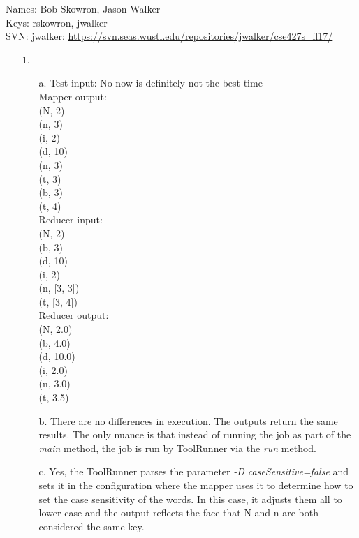 \documentclass{article}
\begin{document}
\begin{flushleft}
Names: Bob Skowron, Jason Walker\\
Keys: rskowron, jwalker\\
SVN: jwalker: \url{https://svn.seas.wustl.edu/repositories/jwalker/cse427s_fl17/}\\
\end{flushleft}

\begin{itemize}
\item[1.] 
	\begin{itemize}
	\item[a.] Test input: No now is definitely not the best time \\
		Mapper output:\\
			(N, 2)\\
			(n, 3)\\
			(i, 2)\\
			(d, 10)\\
			(n, 3)\\
			(t, 3)\\
			(b, 3)\\
			(t, 4)\\
		Reducer input:\\
			(N, 2)\\
			(b, 3)\\
			(d, 10)\\
			(i, 2)\\
			(n, [3, 3])\\	
			(t, [3, 4])\\
		Reducer output:\\
			(N, 2.0)\\
			(b, 4.0)\\
			(d, 10.0)\\
			(i, 2.0)\\
			(n, 3.0)\\
			(t, 3.5)\\
	\item[b.] There are no differences in execution. The outputs return the same results. The only nuance is that instead of running the job as part of the \textit{main} method, the job is run by ToolRunner via the \textit{run} method.
	\item[c.] Yes, the ToolRunner parses the parameter \textit{-D caseSensitive=false} and sets it in the configuration where the mapper uses it to determine how to set the case sensitivity of the words. In this case, it adjusts them all to lower case and the output reflects the face that N and n are both considered the same key.

\end{itemize}
\end{itemize}
\end{document}
